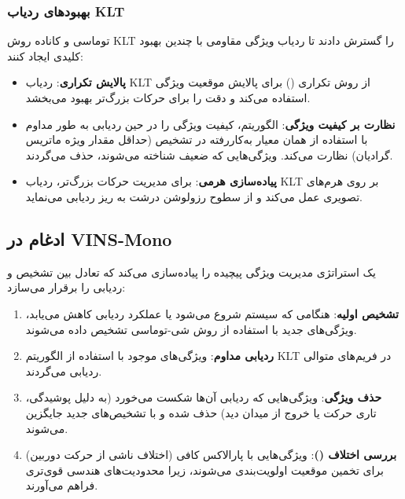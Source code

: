 \documentclass[11pt, a4paper]{article}
\begin{document}
	\subsubsection{بهبودهای ردیاب \gls{KLT}}
	توماسی و کاناده \cite{tomasi1991detection} روش \gls{KLT} را گسترش دادند تا ردیاب ویژگی مقاومی با چندین بهبود کلیدی ایجاد کنند:
	
	\begin{itemize}
		\item \textbf{پالایش تکراری}: ردیاب KLT از روش تکراری  
		() 
		برای پالایش موقعیت ویژگی استفاده می‌کند و دقت را برای حرکات بزرگ‌تر بهبود می‌بخشد.
		
		\item \textbf{نظارت بر کیفیت ویژگی}: الگوریتم، کیفیت ویژگی را در حین ردیابی به طور مداوم با استفاده از همان معیار به‌کاررفته در تشخیص (حداقل مقدار ویژه ماتریس گرادیان) نظارت می‌کند. ویژگی‌هایی که ضعیف شناخته می‌شوند، حذف می‌گردند.
		
		\item \textbf{پیاده‌سازی هرمی}: برای مدیریت حرکات بزرگ‌تر، ردیاب KLT بر روی هرم‌های تصویری عمل می‌کند و از سطوح رزولوشن درشت به ریز ردیابی می‌نماید.
	\end{itemize}
	
	\subsection{ادغام در VINS-Mono}
	
	
	یک استراتژی مدیریت ویژگی پیچیده را پیاده‌سازی می‌کند که تعادل بین تشخیص و ردیابی را برقرار می‌سازد:
	
	\begin{enumerate}
		\item \textbf{تشخیص اولیه}: هنگامی که سیستم شروع می‌شود یا عملکرد ردیابی کاهش می‌یابد، ویژگی‌های جدید با استفاده از روش شی-توماسی تشخیص داده می‌شوند.
		
		\item \textbf{ردیابی مداوم}: ویژگی‌های موجود با استفاده از الگوریتم \gls{KLT} در فریم‌های متوالی ردیابی می‌گردند.
		
		\item \textbf{حذف ویژگی}: ویژگی‌هایی که ردیابی آن‌ها شکست می‌خورد (به دلیل پوشیدگی، تاری حرکت یا خروج از میدان دید) حذف شده و با تشخیص‌های جدید جایگزین می‌شوند.
		
		\item \textbf{بررسی اختلاف 
			()}: ویژگی‌هایی با پارالاکس کافی (اختلاف ناشی از حرکت دوربین) برای تخمین موقعیت اولویت‌بندی می‌شوند، زیرا محدودیت‌های هندسی قوی‌تری فراهم می‌آورند.
	\end{enumerate}
	
\end{document}
